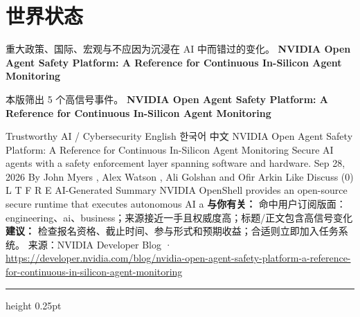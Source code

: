 \documentclass[10.5pt]{ctexart}
\begin{document}
\section*{世界状态}
{\color{ormuted} 重大政策、国际、宏观与不应因为沉浸在 AI 中而错过的变化。}
\vspace{2mm}
{\LARGE\bfseries NVIDIA Open Agent Safety Platform: A Reference for Continuous In-Silicon Agent Monitoring}\par
\vspace{1mm}
{\color{ormuted} 本版筛出 5 个高信号事件。}
\vspace{3mm}
{\Large\bfseries NVIDIA Open Agent Safety Platform: A Reference for Continuous In-Silicon Agent Monitoring}\par
Trustworthy AI / Cybersecurity English 한국어 中文 NVIDIA Open Agent Safety Platform: A Reference for Continuous In-Silicon Agent Monitoring Secure AI agents with a safety enforcement layer spanning software and hardware. Sep 28, 2026 By John Myers , Alex Watson , Ali Golshan and Ofir Arkin Like Discuss (0) L T F R E AI-Generated Summary NVIDIA OpenShell provides an open-source secure runtime that executes autonomous AI a
\textbf{与你有关：} 命中用户订阅版面：engineering、ai、business；来源接近一手且权威度高；标题/正文包含高信号变化
\textbf{建议：} 检查报名资格、截止时间、参与形式和预期收益；合适则立即加入任务系统。
{\footnotesize\color{ormuted} 来源：NVIDIA Developer Blog · \url{https://developer.nvidia.com/blog/nvidia-open-agent-safety-platform-a-reference-for-continuous-in-silicon-agent-monitoring}}
\vspace{4mm}
\hrule height 0.25pt
\vspace{3mm}
\end{document}
